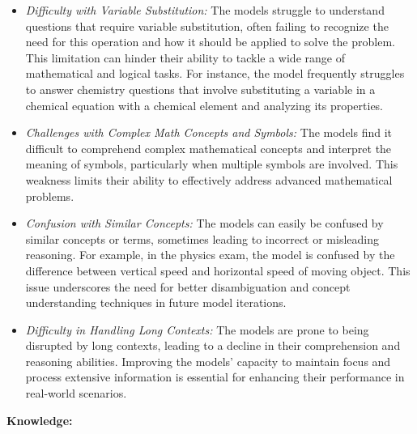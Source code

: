 \begin{itemize}
\item \textit{Difficulty with Variable Substitution:} The models struggle to understand questions that require variable substitution, often failing to recognize the need for this operation and how it should be applied to solve the problem. This limitation can hinder their ability to tackle a wide range of mathematical and logical tasks. For instance, the model frequently struggles to answer chemistry questions that involve substituting a variable in a chemical equation with a chemical element and analyzing its properties.
\item \textit{Challenges with Complex Math Concepts and Symbols:} The models find it difficult to comprehend complex mathematical concepts and interpret the meaning of symbols, particularly when multiple symbols are involved. This weakness limits their ability to effectively address advanced mathematical problems.
\item \textit{Confusion with Similar Concepts:} The models can easily be confused by similar concepts or terms, sometimes leading to incorrect or misleading reasoning. For example, in the physics exam, the model is confused by the difference between vertical speed and horizontal speed of moving object. This issue underscores the need for better disambiguation and concept understanding techniques in future model iterations.

\item \textit{Difficulty in Handling Long Contexts:} The models are prone to being disrupted by long contexts, leading to a decline in their comprehension and reasoning abilities. Improving the models' capacity to maintain focus and process extensive information is essential for enhancing their performance in real-world scenarios.

\end{itemize}

\textbf{Knowledge:}

